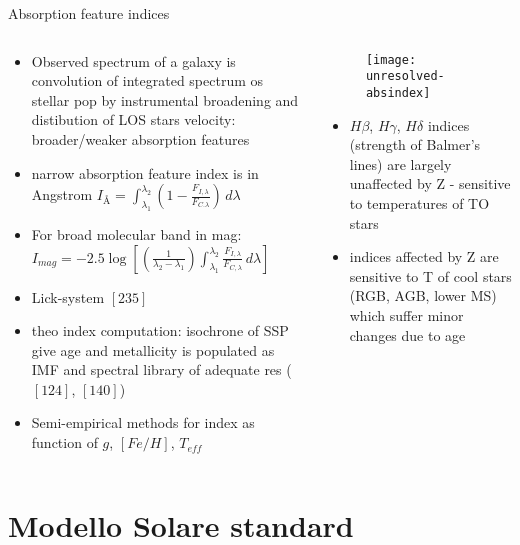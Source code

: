 \begin{frame}{Absorption feature indices}
\begin{columns}\begin{column}{0.5\textwidth}
\begin{itemize}
\item Observed spectrum of a galaxy is convolution of integrated spectrum os stellar pop by instrumental broadening and distibution of LOS stars velocity: broader/weaker absorption features
\item narrow absorption feature index is in Angstrom
    $I_{\si{\angstrom}}=\int_{\lambda_1}^{\lambda_2}(1-\frac{F_{I,\lambda}}{F_{C.\lambda}})\,d\lambda$
\item For broad molecular band in mag: $I_{mag}=-2.5\log{[(\frac{1}{\lambda_2-\lambda_1})\int_{\lambda_1}^{\lambda_2}\frac{F_{I,\lambda}}{F_{C,\lambda}}\,d\lambda]}$
\item Lick-system $[235]$
\item theo index computation: isochrone of SSP give age and metallicity is populated as IMF and spectral library of adequate res ($[124]$, $[140]$)
\item Semi-empirical methods for index as function of $g$, $[Fe/H]$, $T_{eff}$
\end{itemize} 
\end{column} \begin{column}{0.5\textwidth}
\begin{figure}[!ht]
\texttt{[image: unresolved-absindex]}
\end{figure}
\begin{itemize}
\item $H\beta$, $H\gamma$, $H\delta$ indices (strength of Balmer's lines) are largely unaffected by Z - sensitive to temperatures of TO stars
\item indices affected by Z are sensitive to T of cool stars (RGB, AGB, lower MS) which suffer minor changes due to age
\end{itemize}
\end{column}\end{columns}
\end{frame}

\section{Modello Solare standard}

